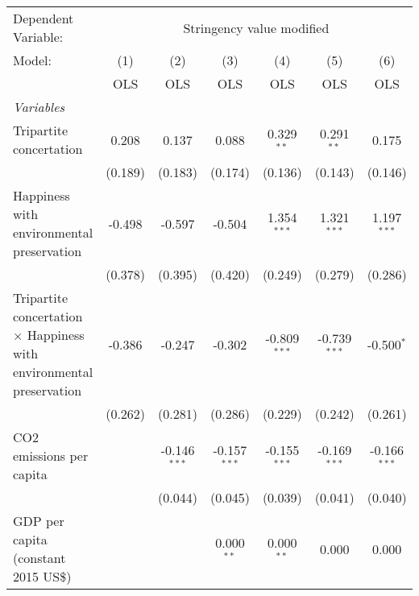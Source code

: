 
\begingroup
\centering
\begin{tabular}{lcccccc}
   \toprule
   Dependent Variable: & \multicolumn{6}{c}{Stringency value modified}\\
   Model:                                                                      & (1)     & (2)            & (3)            & (4)            & (5)            & (6)\\  
                                                                               &  OLS    & OLS            & OLS            & OLS            & OLS            & OLS\\  
   \midrule
   \emph{Variables}\\
   Tripartite concertation                                                     & 0.208   & 0.137          & 0.088          & 0.329$^{**}$   & 0.291$^{**}$   & 0.175\\   
                                                                               & (0.189) & (0.183)        & (0.174)        & (0.136)        & (0.143)        & (0.146)\\   
   Happiness with environmental preservation                                   & -0.498  & -0.597         & -0.504         & 1.354$^{***}$  & 1.321$^{***}$  & 1.197$^{***}$\\   
                                                                               & (0.378) & (0.395)        & (0.420)        & (0.249)        & (0.279)        & (0.286)\\   
   Tripartite concertation $\times$ Happiness with environmental preservation  & -0.386  & -0.247         & -0.302         & -0.809$^{***}$ & -0.739$^{***}$ & -0.500$^{*}$\\   
                                                                               & (0.262) & (0.281)        & (0.286)        & (0.229)        & (0.242)        & (0.261)\\   
   CO2 emissions per capita                                                    &         & -0.146$^{***}$ & -0.157$^{***}$ & -0.155$^{***}$ & -0.169$^{***}$ & -0.166$^{***}$\\   
                                                                               &         & (0.044)        & (0.045)        & (0.039)        & (0.041)        & (0.040)\\   
   GDP per capita (constant 2015 US\$)                                         &         &                & 0.000$^{**}$   & 0.000$^{**}$   & 0.000          & 0.000\\   

\end{tabular}
